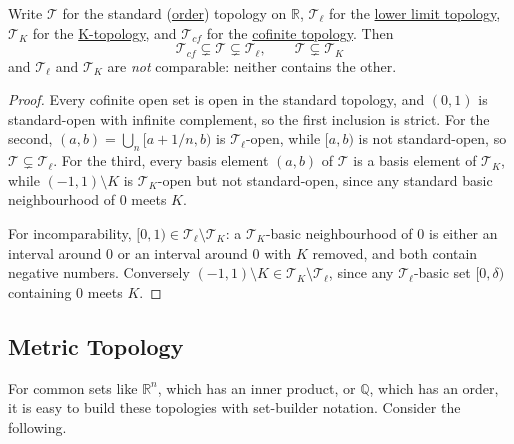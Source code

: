   \begin{theorem}
    \label{thm:comparison-of-topologies-of-the-real-line}
    Write $\mathcal{T}$ for the standard (\hyperref[def:order-topology]{order}) topology on $\mathbb{R}$, $\mathcal{T}_\ell$ for the \hyperref[ex:lower-upper-limit-topology]{lower limit topology}, $\mathcal{T}_K$ for the \hyperref[ex:k-topology]{K-topology}, and $\mathcal{T}_{cf}$ for the \hyperref[def:cofinite-topology]{cofinite topology}. Then
    \begin{equation}
      \mathcal{T}_{cf} \subsetneq \mathcal{T} \subsetneq \mathcal{T}_\ell, \qquad \mathcal{T} \subsetneq \mathcal{T}_K
    \end{equation}
    and $\mathcal{T}_\ell$ and $\mathcal{T}_K$ are \textit{not} comparable: neither contains the other. 
  \end{theorem}
  \begin{proof}
    Every cofinite open set is open in the standard topology, and $(0,1)$ is standard-open with infinite complement, so the first inclusion is strict. For the second, $(a,b) = \bigcup_{n} [a + 1/n, b)$ is $\mathcal{T}_\ell$-open, while $[a, b)$ is not standard-open, so $\mathcal{T} \subsetneq \mathcal{T}_\ell$. For the third, every basis element $(a,b)$ of $\mathcal{T}$ is a basis element of $\mathcal{T}_K$, while $(-1,1) \setminus K$ is $\mathcal{T}_K$-open but not standard-open, since any standard basic neighbourhood of $0$ meets $K$. 

    For incomparability, $[0,1) \in \mathcal{T}_\ell \setminus \mathcal{T}_K$: a $\mathcal{T}_K$-basic neighbourhood of $0$ is either an interval around $0$ or an interval around $0$ with $K$ removed, and both contain negative numbers. Conversely $(-1,1) \setminus K \in \mathcal{T}_K \setminus \mathcal{T}_\ell$, since any $\mathcal{T}_\ell$-basic set $[0, \delta)$ containing $0$ meets $K$. 
  \end{proof}

\subsection{Metric Topology}

  For common sets like $\mathbb{R}^n$, which has an inner product, or $\mathbb{Q}$, which has an order, it is easy to build these topologies with set-builder notation. Consider the following. 


